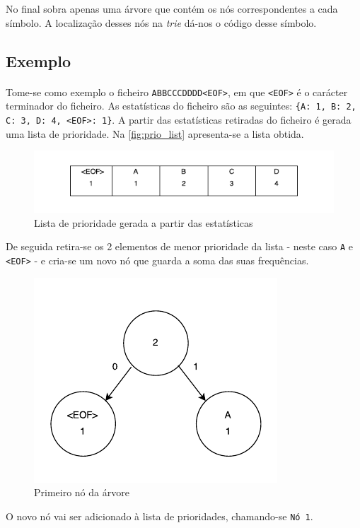 \documentclass[a4paper]{article}
\begin{document}
	No final sobra apenas uma árvore que contém os nós correspondentes a cada símbolo. A localização desses nós na \textit{trie} dá-nos o código desse símbolo.

	\subsection*{Exemplo}

	\paragraph{} Tome-se como exemplo o ficheiro \texttt{ABBCCCDDDD<EOF>}, em que \texttt{<EOF>} é o carácter terminador do ficheiro. As estatísticas do ficheiro são as seguintes: \texttt{\{A: 1, B: 2, C: 3, D: 4, <EOF>: 1\}}. A partir das estatísticas retiradas do ficheiro é gerada uma lista de prioridade. Na \autoref{fig:prio_list} apresenta-se a lista obtida.

  \begin{figure}[H]
    \centering
    \includegraphics[width=.65\textwidth]{img/prio_list}
    \caption{Lista de prioridade gerada a partir das estatísticas}
    \label{fig:prio_list}
  \end{figure}

  De seguida retira-se os 2 elementos de menor prioridade da lista - neste caso \texttt{A} e \texttt{<EOF>} - e cria-se um novo nó que guarda a soma das suas frequências.

  \begin{figure}[H]
    \centering
    \includegraphics[width=.5\textwidth]{img/trie_1}
    \caption{Primeiro nó da árvore}
    \label{fig:trie_1}
  \end{figure}

  O novo nó vai ser adicionado à lista de prioridades, chamando-se \texttt{Nó 1}.
\end{document}
